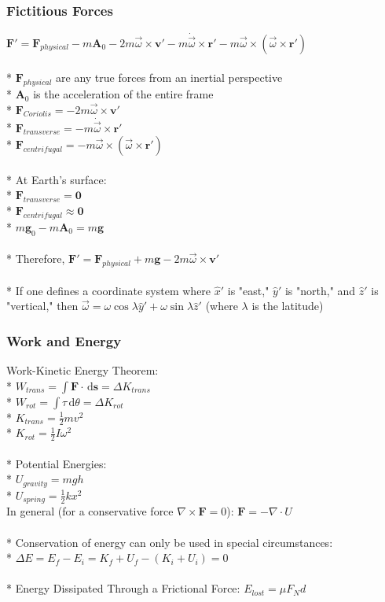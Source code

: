 \subsubsection{Fictitious Forces}
\(\mathbf{F}'=\mathbf{F}_{physical}-m\mathbf{A}_0-2m\vec{\omega}\times \mathbf{v}'-m\dot{\vec{\omega}}\times \mathbf{r}'-m\vec{\omega}\times\left( \vec{\omega}\times\mathbf{r}' \right)\)\\\\*
\(\mathbf{F}_{physical}\) are any true forces from an inertial perspective\\*
\(\mathbf{A}_0\) is the acceleration of the entire frame\\*
\(\mathbf{F}_{Coriolis}=-2m\vec{\omega}\times \mathbf{v}'\)\\*
\(\mathbf{F}_{transverse}=-m\dot{\vec{\omega}}\times \mathbf{r}'\)\\*
\(\mathbf{F}_{centrifugal}=-m\vec{\omega}\times\left( \vec{\omega}\times\mathbf{r}' \right)\)\\\\*
At Earth's surface:\\*
\(\mathbf{F}_{transverse}=\mathbf{0}\)\\*
\(\mathbf{F}_{centrifugal}\approx\mathbf{0}\)\\*
\(m\mathbf{g}_0-m\mathbf{A}_0=m\mathbf{g}\)\\\\*
Therefore, \(\mathbf{F}'=\mathbf{F}_{physical}+m\mathbf{g}-2m\vec{\omega}\times \mathbf{v}'\)\\\\*
If one defines a coordinate system where \(\hat{x}'\) is "east," \(\hat{y}'\) is "north," and \(\hat{z}'\) is "vertical," then \(\vec{\omega}=\omega\cos{\lambda}\hat{y}'+\omega\sin{\lambda}\hat{z}'\) (where \(\lambda\) is the latitude)

\subsubsection{Work and Energy}
Work-Kinetic Energy Theorem:\\*
\(\displaystyle W_{trans}=\int \mathbf{F}\cdot\,\mathrm{d}\mathbf{s}=\Delta K_{trans}\)\\*
\(\displaystyle W_{rot}=\int \tau\,\mathrm{d}\theta=\Delta K_{rot}\)\\*
\(K_{trans}=\frac{1}{2}mv^2\)\\*
\(K_{rot}=\frac{1}{2}I\omega^2\)\\\\*
Potential Energies:\\*
\(U_{gravity}=mgh\)\\*
\(U_{spring}=\frac{1}{2}kx^2\)\\
In general (for a conservative force \(\nabla\times\mathbf{F}=0\)): \(\mathbf{F}=-\nabla\cdot U\)\\\\*
Conservation of energy can only be used in special circumstances:\\*
\(\Delta E=E_f-E_i=K_f+U_f-(K_i+U_i)=0\)\\\\*
Energy Dissipated Through a Frictional Force: \(E_{lost}=\mu F_Nd\)


